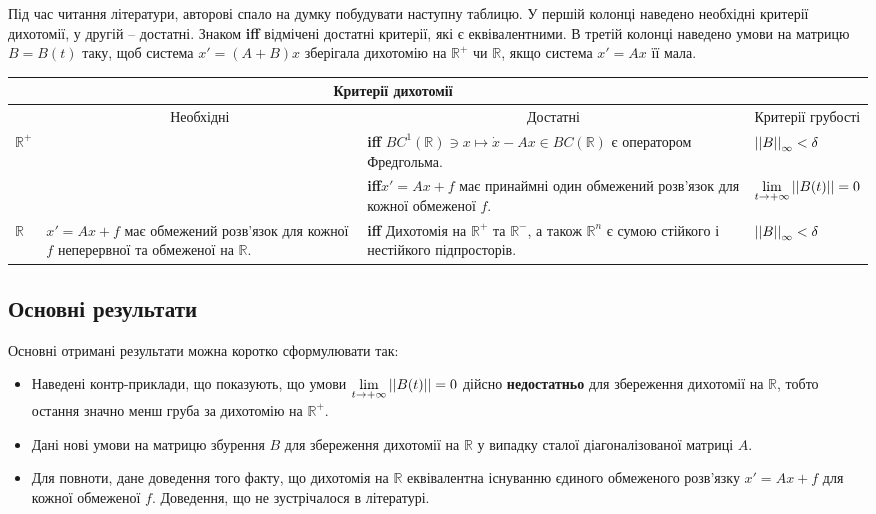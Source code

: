 \documentclass{SHVpaper}
\begin{document}
Під час читання літератури, авторові спало на думку побудувати наступну таблицю. У першій колонці наведено необхідні критерії
дихотомії, у другій -- достатні. Знаком \textbf{iff} відмічені достатні критерії, які є еквівалентними. В третій колонці
наведено умови на матрицю $B=B(t)$ таку, щоб система $x'=(A+B)x$ зберігала дихотомію на $\mathbb{R}^+$ чи $\mathbb{R}$, якщо
система $x'=Ax$ її мала.
\begin{center}
\newcommand{\mygraycenteredcell}[1]{\multicolumn{1}{c|}{\cellcolor{gray}#1}}
\newcommand{\mygraycenteredcello}{\cellcolor{gray}}

\begin{tabular}{ |l| p{} | p{} | p{}| }
	\mygraycenteredcello&\multicolumn{2}{c|}{\cellcolor{gray}Критерії дихотомії}&\mygraycenteredcello\\\hline
&\mygraycenteredcell{Необхідні}&\mygraycenteredcell{Достатні}&\mygraycenteredcell{Критерії грубості}\\\hline\hline

$\mathbb{R}^+$&
&
\textbf{iff} $BC^1(\mathbb{R})\ni x\mapsto \dot{x}-Ax\in BC(\mathbb{R})$ є оператором Фредгольма. \cite{palmer88}&
$\left|\left|B\right|\right|_\infty<\delta$ \cite{coppel}\\\hline

&
&
\textbf{iff}$x'=Ax+f$ має принаймні один обмежений розв’язок для кожної обмеженої  $f$. \cite{coppel}&
$\lim_{t\to+\infty}\mynorm{B(t)}=0$\cite{coppel}\\\hline\hline

$\mathbb{R}$&
$x'=Ax+f$ має обмежений розв’язок для кожної $f$ неперервної та обмеженої на $\mathbb{R}$.&
\textbf{iff} Дихотомія на $\mathbb{R}^+$ та $\mathbb{R}^-$, а також $\mathbb{R}^n$ є сумою стійкого і нестійкого підпросторів.
	\cite[Proposition 2.1]{palmer84} &
$\left|\left|B\right|\right|_\infty<\delta$\cite{coppel}\\\hline
\end{tabular}
\end{center}
\subsection{Основні результати}
Основні отримані результати можна коротко сформулювати так:
\begin{itemize}
	\item Наведені контр-приклади, що показують, що умови $\lim_{t\to+\infty}\mynorm{B(t)}=0$ дійсно \textbf{недостатньо} 
		для збереження дихотомії на $\mathbb{R}$, тобто остання значно менш груба за дихотомію на $\mathbb{R}^+$.
	\item Дані нові умови на матрицю збурення $B$ для збереження дихотомії на $\mathbb{R}$ у випадку сталої діагоналізованої
		матриці $A$.
	\item Для повноти, дане доведення того факту, що дихотомія на $\mathbb{R}$ еквівалентна існуванню єдиного обмеженого розв’язку
		$x'=Ax+f$ для кожної обмеженої $f$. Доведення, що не зустрічалося в літературі.
\end{itemize}
\end{document}
